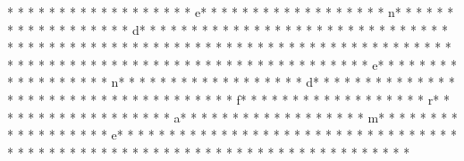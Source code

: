 * * *  * * *  * * *  *  * * *  *  * * *  * e* * *  * * *  * * *  *  * * *  *  * * *  * n* * *  * * *  * * *  *  * * *  *  * * *  * d* * *  * * *  * * *  *  * * *  *  * * *  * {* * *  * * *  * * *  *  * * *  *  * * *  *  * * *  * * *  * * *  *  * * *  *  * * *  * }* * *  * * *  * * *  *  * * *  *  * * *  * 
* * *  * * *  * * *  *  * * *  *  * * *  * 
* * *  * * *  * * *  *  * * *  *  * * *  * e* * *  * * *  * * *  *  * * *  *  * * *  * n* * *  * * *  * * *  *  * * *  *  * * *  * d* * *  * * *  * * *  *  * * *  *  * * *  * {* * *  * * *  * * *  *  * * *  *  * * *  * f* * *  * * *  * * *  *  * * *  *  * * *  * r* * *  * * *  * * *  *  * * *  *  * * *  * a* * *  * * *  * * *  *  * * *  *  * * *  * m* * *  * * *  * * *  *  * * *  *  * * *  * e* * *  * * *  * * *  *  * * *  *  * * *  * }* * *  * * *  * * *  *  * * *  *  * * *  * 
* * *  * * *  * * *  *  * * *  *  * * *  * 
* * *  * * *  * * *  *  * * *  *  * * *  * %
